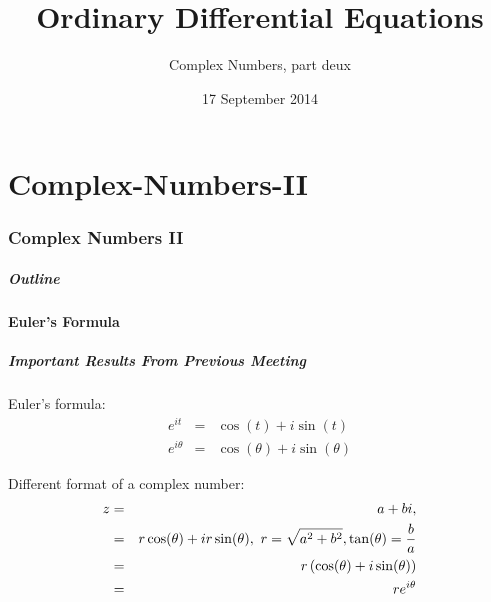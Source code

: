 \part{Complex-Numbers-II}
\section{Complex Numbers II}

\title{Ordinary Differential Equations}
\subtitle{Complex Numbers, part deux}
\date{17 September 2014}

\begin{frame}
  \titlepage
\end{frame}

\begin{frame}
  \frametitle{Outline}
  \tableofcontents[currentsection]
\end{frame}

\subsection{Euler's Formula}
\begin{frame}
  \frametitle{Important Results From Previous Meeting}

  Euler's formula:
  \begin{eqnarray*}
    e^{it} & = & \cos(t) + i\sin(t)\\
    e^{i\theta} & = & \cos(\theta) + i\sin(\theta)
  \end{eqnarray*}

  Different format of a complex number:
    \begin{eqnarray*}
    z & = & a + bi, \\
    & = & r\cos(\theta) + ir\sin(\theta), ~ r = \sqrt{a^2+b^2}, \tan(\theta)=\frac{b}{a} \\
    & = & r \left( \cos(\theta) + i\sin(\theta) \right) \\
    & = & r e^{i\theta}
  \end{eqnarray*}

\end{frame}

